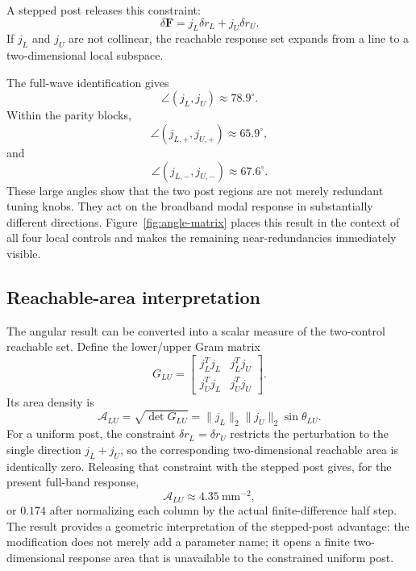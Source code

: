 \documentclass[journal]{IEEEtran}
\begin{document}
A stepped post releases this constraint:
\begin{equation}
\delta\bm F=j_L\delta r_L+j_U\delta r_U.
\label{eq:step}
\end{equation}
If $j_L$ and $j_U$ are not collinear, the reachable response set expands from a line to a two-dimensional local subspace.

The full-wave identification gives
\begin{equation}
\boxed{\angle(j_L,j_U)\approx78.9^\circ}.
\end{equation}
Within the parity blocks,
\begin{equation}
\angle(j_{L,+},j_{U,+})\approx65.9^\circ,
\end{equation}
and
\begin{equation}
\boxed{\angle(j_{L,-},j_{U,-})\approx67.6^\circ}.
\end{equation}
These large angles show that the two post regions are not merely redundant tuning knobs.
They act on the broadband modal response in substantially different directions.
Figure~\ref{fig:angle-matrix} places this result in the context of all four local controls and makes the remaining near-redundancies immediately visible.



\subsection{Reachable-area interpretation}
The angular result can be converted into a scalar measure of the two-control reachable set.  Define the lower/upper Gram matrix
\begin{equation}
G_{LU}=
\begin{bmatrix}
j_L^Tj_L & j_L^Tj_U\\
j_U^Tj_L & j_U^Tj_U
\end{bmatrix}.
\end{equation}
Its area density is
\begin{equation}
\mathcal A_{LU}
=\sqrt{\det G_{LU}}
=\|j_L\|_2\|j_U\|_2\sin\theta_{LU}.
\label{eq:gram-area}
\end{equation}
For a uniform post, the constraint $\delta r_L=\delta r_U$ restricts the perturbation to the single direction $j_L+j_U$, so the corresponding two-dimensional reachable area is identically zero.  Releasing that constraint with the stepped post gives, for the present full-band response,
\begin{equation}
\boxed{\mathcal A_{LU}\approx4.35~\mathrm{mm}^{-2}},
\end{equation}
or $0.174$ after normalizing each column by the actual finite-difference half step.  The result provides a geometric interpretation of the stepped-post advantage: the modification does not merely add a parameter name; it opens a finite two-dimensional response area that is unavailable to the constrained uniform post.
\end{document}
